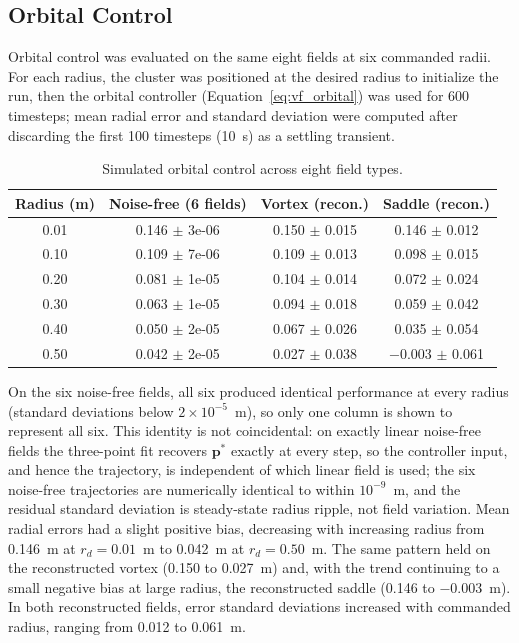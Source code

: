 \documentclass[12pt, letterpaper, oneside]{report}
\begin{document}
\subsection{Orbital Control}

Orbital control was evaluated on the same eight fields at six commanded
radii. For each radius, the cluster was positioned at the desired radius to
initialize the run, then the orbital controller
(Equation~\eqref{eq:vf_orbital}) was used for 600 timesteps; mean radial
error and standard deviation were computed after discarding the first 100
timesteps (10~s) as a settling transient.

\begin{table}[!t]
\centering
\caption{Simulated orbital control across eight field types.}
\label{tab:simulation_orbital_results}
\footnotesize
\begin{tabular}{cccc}
\toprule
\textbf{Radius (m)} & \textbf{Noise-free (6 fields)} & \textbf{Vortex (recon.)} & \textbf{Saddle (recon.)} \\
\midrule
0.01 & 0.146 $\pm$ 3e-06 & 0.150 $\pm$ 0.015 & 0.146 $\pm$ 0.012 \\
0.10 & 0.109 $\pm$ 7e-06 & 0.109 $\pm$ 0.013 & 0.098 $\pm$ 0.015 \\
0.20 & 0.081 $\pm$ 1e-05 & 0.104 $\pm$ 0.014 & 0.072 $\pm$ 0.024 \\
0.30 & 0.063 $\pm$ 1e-05 & 0.094 $\pm$ 0.018 & 0.059 $\pm$ 0.042 \\
0.40 & 0.050 $\pm$ 2e-05 & 0.067 $\pm$ 0.026 & 0.035 $\pm$ 0.054 \\
0.50 & 0.042 $\pm$ 2e-05 & 0.027 $\pm$ 0.038 & $-$0.003 $\pm$ 0.061 \\
\bottomrule
\end{tabular}
\end{table}

On the six noise-free fields, all six produced identical performance at
every radius (standard deviations below $2\times10^{-5}$~m), so only one
column is shown to represent all six. This identity is not coincidental: on
exactly linear noise-free fields the three-point fit recovers
$\mathbf{p}^*$ exactly at every step, so the controller input, and hence
the trajectory, is independent of which linear field is used; the six
noise-free trajectories are numerically identical to within $10^{-9}$~m,
and the residual standard deviation is steady-state radius ripple, not
field variation. Mean radial errors had a slight positive bias, decreasing
with increasing radius from 0.146~m at $r_d=0.01$~m to 0.042~m at
$r_d=0.50$~m. The same pattern held on the reconstructed vortex (0.150 to
0.027~m) and, with the trend continuing to a small negative bias at large
radius, the reconstructed saddle (0.146 to $-0.003$~m). In both
reconstructed fields, error standard deviations increased with commanded
radius, ranging from 0.012 to 0.061~m.
\end{document}
